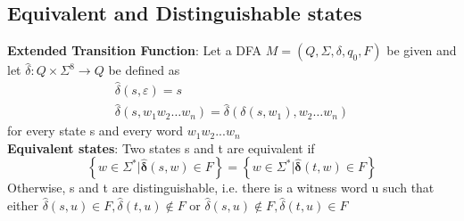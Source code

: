 \documentclass{article}[18pt]
\begin{document}
\subsection{Equivalent and Distinguishable states}
\textbf{Extended Transition Function}: Let a DFA $M=(Q,\Sigma, \delta, q_0, F)$ be given and let $\hat{\delta}: Q\times \Sigma^8\rightarrow Q$ be defined as
\[
\begin{array}{c}
{\hat{\delta}(s, \varepsilon)=s} \\
{\hat{\delta}\left(s, w_{1} w_{2} \ldots w_{n}\right)=\hat{\delta}\left(\delta\left(s, w_{1}\right), w_{2} \ldots w_{n}\right)}
\end{array}
\]
for every state s and every word $w_1w_2...w_n$\\
\textbf{Equivalent states}: Two states s and t are equivalent if
\[
\left\{w \in \Sigma^{*} | \hat{\boldsymbol{\delta}}(s, w) \in F\right\}=\left\{w \in \Sigma^{*} | \hat{\boldsymbol{\delta}}(t, w) \in F\right\}
\]
Otherwise, s and t are distinguishable, i.e. there is a witness word u such that either \(\hat{\delta}(s, u) \in F, \hat{\delta}(t, u) \notin F\) or \(\hat{\delta}(s, u) \notin F, \hat{\delta}(t, u) \in F\)
\end{document}
